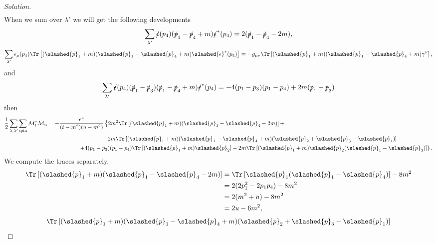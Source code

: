 \begin{proof}[Solution]
\begin{align*}
    \end{align*}
    When we sum over \(\lambda'\) we will get the following developments
    \begin{equation*}
        \sum_{\lambda'}\slashed{\epsilon}(p_4)(\slashed{p}_1 - \slashed{p}_4 + m) \slashed{\epsilon}^*(p_4) = 2(\slashed{p}_1 - \slashed{p}_4 - 2m),
    \end{equation*}
    \begin{equation*}
        \sum_{\lambda'} \epsilon_\mu(p_4) \Tr\left[(\slashed{p}_1 + m) (\slashed{p}_1 - \slashed{p}_4 + m) \slashed{\epsilon}^*(p_4)\right] = - g_{\mu\nu} \Tr\left[(\slashed{p}_1 + m)(\slashed{p}_1 - \slashed{p}_4 + m) \gamma^\nu\right],
    \end{equation*}
    and
    \begin{equation*}
        \sum_{\lambda'} \slashed{\epsilon}(p_4) (\slashed{p}_1 - \slashed{p}_3) (\slashed{p}_1 - \slashed{p}_4 + m) \slashed{\epsilon}^*(p_4) = - 4(p_1 - p_3)(p_1 - p_4) + 2m (\slashed{p}_1 - \slashed{p}_3)
    \end{equation*}
    then
    \begin{align*}
        \frac12 \sum_{\lambda, \lambda'} \sum_{\mathrm{spin}} \mathcal{M}_t^* \mathcal{M}_u 
        &= - \frac{e^4}{(t - m^2)(u - m^2)} \left\{2m^2 \Tr\left[(\slashed{p}_1 + m)(\slashed{p}_1 - \slashed{p}_4 - 2m)\right]+\right.\\
        &{}\phantom{=-(t - m^2)(u - m^2)} -2m \Tr\left[(\slashed{p}_1 + m)(\slashed{p}_1 - \slashed{p}_4 + m)(\slashed{p}_2 + \slashed{p}_3 - \slashed{p}_1)\right]\\
        &{}\phantom{=-(t - m^2)} \left.+ 4(p_1 - p_3)(p_1 - p_4) \Tr\left[(\slashed{p}_1 + m)\slashed{p}_2\right] - 2m \Tr\left[(\slashed{p}_1 + m)\slashed{p}_2(\slashed{p}_1 - \slashed{p}_3)\right]\right\}.
    \end{align*}
    We compute the traces separately,
    \begin{align*}
        \Tr\left[(\slashed{p}_1 + m)(\slashed{p}_1 - \slashed{p}_4 - 2m)\right] 
        &= \Tr\left[\slashed{p}_1(\slashed{p}_1 - \slashed{p}_4)\right] - 8m^2\\
        &= 2(2p_1^2 - 2p_1 p_4) - 8m^2\\
        &= 2(m^2 + u) - 8m^2\\
        &= 2u - 6m^2,
    \end{align*}
    \begin{align*}
        \Tr\left[(\slashed{p}_1 + m)(\slashed{p}_1 - \slashed{p}_4 + m)(\slashed{p}_2 + \slashed{p}_3 - \slashed{p}_1)\right] 

\end{align*}
\end{proof}
